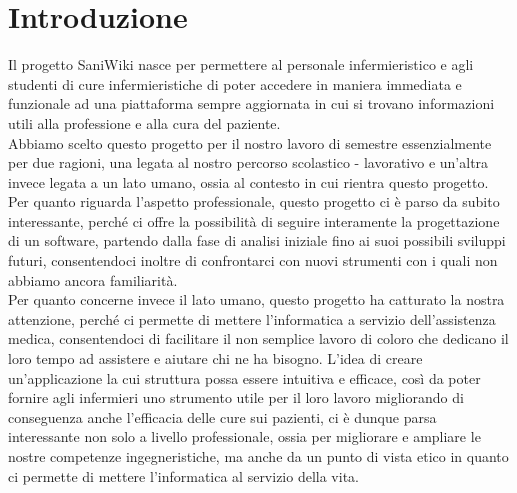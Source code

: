 \documentclass[twoside]{supsistudent}
\begin{document}
\maketitle
\onehalfspacing
\frontmatter


\tableofcontents
\listoffigures


\newpage
\mainmatter
{}
\setcounter{page}{1}

\chapter{Introduzione}
Il progetto SaniWiki nasce per permettere al personale infermieristico e agli studenti di cure infermieristiche di poter accedere in maniera immediata e funzionale ad una piattaforma sempre aggiornata in cui si trovano informazioni utili alla professione e alla cura del paziente.\\

Abbiamo scelto questo progetto per il nostro lavoro di semestre essenzialmente per due ragioni, una legata al nostro percorso scolastico - lavorativo e un’altra invece legata a un lato umano, ossia al contesto in cui rientra questo progetto. Per quanto riguarda l’aspetto professionale, questo progetto ci è parso da subito interessante, perché ci offre la possibilità
di seguire interamente la progettazione di un software, partendo dalla fase di analisi iniziale fino ai suoi possibili sviluppi futuri, consentendoci inoltre di confrontarci con nuovi strumenti con i quali non abbiamo ancora familiarità.\\

Per quanto concerne invece il lato umano, questo progetto ha catturato la nostra
attenzione, perché ci permette di mettere l’informatica a servizio dell’assistenza medica,
consentendoci di facilitare il non semplice lavoro di coloro che dedicano il loro tempo ad
assistere e aiutare chi ne ha bisogno. L’idea di creare un’applicazione la cui struttura possa
essere intuitiva e efficace, così da poter fornire agli infermieri uno strumento utile per il loro
lavoro migliorando di conseguenza anche l’efficacia delle cure sui pazienti, ci è dunque
parsa interessante non solo a livello professionale, ossia per migliorare e ampliare le nostre
competenze ingegneristiche, ma anche da un punto di vista etico in quanto ci permette
di mettere l’informatica al servizio della vita.
\end{document}
